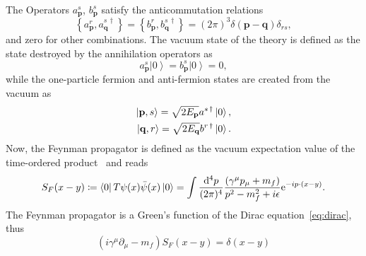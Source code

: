 The Operators $a^{s}_{\mathbf{p}}$, $b^{s}_{\mathbf{p}}$ satisfy the anticommutation relations
\begin{equation}
\left\{ a^{r}_\mathbf{p},a^{s\,\dagger}_\mathbf{q}\right\} = \left\{ b^{r}_\mathbf{p},b^{s\,\dagger}_\mathbf{q}\right\} = (2\pi)^3 \delta (\mathbf{p}-\mathbf{q})\delta_{rs},
\end{equation}
and zero for other combinations. The vacuum state of the theory is defined as the state destroyed by the annihilation operators as
\begin{equation}
a^s_\mathbf{p}\left|0\right> = b^s_\mathbf{p}\left|0\right> = 0,
\end{equation}
while the one-particle fermion and anti-fermion states are created from the vacuum as
\begin{align}
\left|\mathbf{p},s\right> = \sqrt{2E_\mathbf{p}}a^{s\,\dagger}\left|0\right>,\notag\\
\left|\mathbf{q},r\right> = \sqrt{2E_\mathbf{q}}b^{r\,\dagger}\left|0\right>.
\end{align}
Now, the Feynman propagator is defined as the vacuum expectation value of the time-ordered product~\cite[Section 3.5.]{peskin1995} and reads
\begin{equation}
S_F(x-y)\coloneqq \left<0\right|T\psi(x)\bar{\psi}(x)\left|0\right>=\int \frac{\mathrm{d}^4p}{(2\pi)^4}\frac{ (\gamma^\mu p_\mu+m_f)}{p^2-m_f^2+i\epsilon}\text{e}^{-ip\cdot(x-y)}.
\label{eq:freepropdef}
\end{equation}
The Feynman propagator is a Green's function of the Dirac equation~\eqref{eq:dirac}, thus
\begin{equation}
\left(i\gamma^\mu \partial_\mu -m_f\right)S_F(x-y)=\delta(x-y)
\label{eq:freeprop}
\end{equation} 
